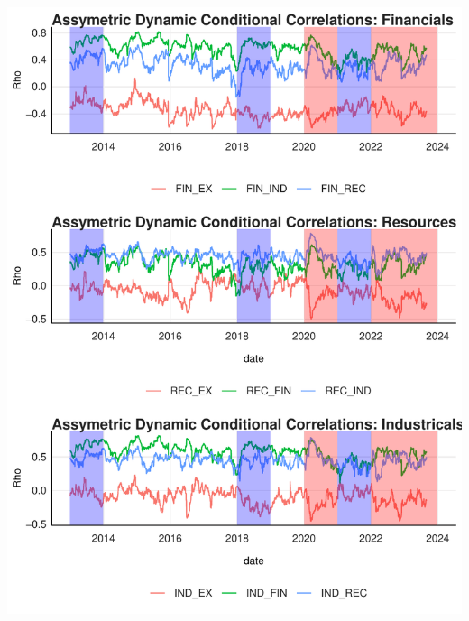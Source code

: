 \documentclass[11pt,preprint, authoryear]{elsarticle}
\let\origfigure\figure
\let\endorigfigure\endfigure
\renewenvironment{figure}[1][2] {
    \expandafter\origfigure\expandafter[H]
} {
    \endorigfigure
}
\numberwithin{equation}{section}
\numberwithin{figure}{section}
\numberwithin{table}{section}
\begin{document}
\begin{figure}[H]

{\centering \includegraphics{WriteUp_files/figure-latex/Figure3-1} 

}

\caption{aDCC  \label{Figure3}}\label{fig:Figure3}
\end{figure}
\end{document}
